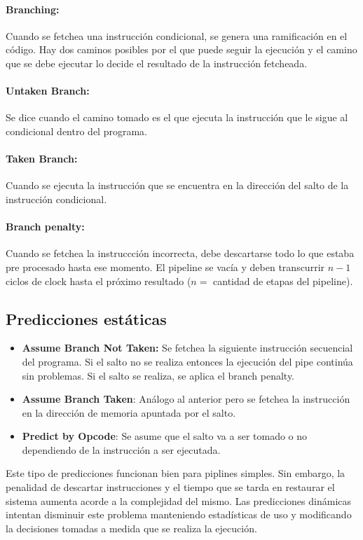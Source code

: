 \paragraph{Branching:} Cuando se fetchea una instrucción condicional, se genera una ramificación en el código. Hay dos caminos posibles por el que puede seguir la ejecución y el camino que se debe ejecutar lo decide el resultado de la instrucción fetcheada. 

\paragraph{Untaken Branch:} Se dice cuando el camino tomado es el que ejecuta la instrucción que le sigue al condicional dentro del programa.

\paragraph{Taken Branch:} Cuando se ejecuta la instrucción que se encuentra en la dirección del salto de la instrucción condicional.

\paragraph{Branch penalty:} Cuando se fetchea la instruccción incorrecta, debe descartarse todo lo que estaba pre procesado hasta ese momento. El pipeline se vacía y deben transcurrir $n-1$ ciclos de clock hasta el próximo resultado ($n = $ cantidad de etapas del pipeline).

\subsection{Predicciones estáticas}
\begin{itemize}
	\item \textbf{Assume Branch Not Taken:}  Se fetchea la siguiente instrucción secuencial del programa. Si el salto no se realiza entonces la ejecución del pipe continúa sin problemas. Si el salto se realiza, se aplica el branch penalty.
	\item \textbf{Assume Branch Taken}: Análogo al anterior pero se fetchea la instrucción en la dirección de memoria apuntada por el salto.
	\item \textbf{Predict by Opcode}: Se asume que el salto va a ser tomado o no dependiendo de la instrucción a ser ejecutada.
\end{itemize}

Este tipo de predicciones funcionan bien para piplines simples. Sin embargo, la penalidad de descartar instrucciones y el tiempo que se tarda en restaurar el sistema aumenta acorde a la complejidad del mismo. Las predicciones dinámicas intentan disminuir este problema manteniendo estadísticas de uso y modificando la decisiones tomadas a medida que se realiza la ejecución.

